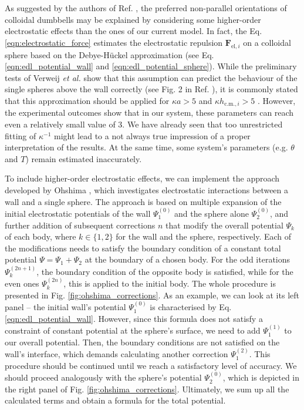 \documentclass{master_thesis}
\begin{document}
As suggested by the authors of Ref. \cite{verweij2021}, the preferred non-parallel orientations of colloidal dumbbells may be explained by considering some higher-order electrostatic effects than the ones of our current model. In fact, the Eq. \eqref{eqn:electrostatic_force} estimates the electrostatic repulsion $\boldsymbol{F}_{\textrm{el},i}$ on a colloidal sphere based on the Debye-Hückel approximation (see Eq. \eqref{eqn:edl_potential_wall} and \eqref{eqn:edl_potential_sphere}). While the preliminary tests of Verweij \textit{et al.} \cite{verweij2021} show that this assumption can predict the behaviour of the single spheres above the wall correctly (see Fig. 2 in Ref. \cite{verweij2021}), it is commonly stated that this approximation should be applied for $\kappa a>5$ and $\kappa h_{\textrm{c.m.},i}>5$ \cite{verwey_overbeek_1948,kim_karilla,andelman_2006}. However, the experimental outcomes show that in our system, these parameters can reach even a relatively small value of 3. We have already seen that too unrestricted fitting of $\kappa^{-1}$ might lead to a not always true impression of a proper interpretation of the results. At the same time, some system's parameters (e.g. $\theta$ and $T$) remain estimated inaccurately.

To include higher-order electrostatic effects, we can implement the approach developed by Ohshima \cite{ohshima1998}, which investigates electrostatic interactions between a wall and a single sphere. The approach is based on multiple expansion of the initial electrostatic potentials of the wall $\Psi_1^{(0)}$ and the sphere alone $\Psi_2^{(0)}$, and further addition of subsequent corrections $n$ that modify the overall potential $\Psi_k$ of each body, where $k\in \{1,2\}$ for the wall and the sphere, respectively. Each of the modifications needs to satisfy the boundary condition of a constant total potential $\Psi=\Psi_1 + \Psi_2$ at the boundary of a chosen body. For the odd iterations $\Psi^{(2n + 1)}_k$, the boundary condition of the opposite body is satisfied, while for the even ones $\Psi^{(2n)}_k$, this is applied to the initial body. The whole procedure is presented in Fig. \ref{fig:ohshima_corrections}. As an example, we can look at its left panel -- the initial wall's potential $\Psi_1^{(0)}$ is characterised by Eq. \eqref{eqn:edl_potential_wall}. However, since this formula does not satisfy a constraint of constant potential at the sphere's surface, we need to add $\Psi_1^{(1)}$ to our overall potential. Then, the boundary conditions are not satisfied on the wall's interface, which demands calculating another correction $\Psi_1^{(2)}$. This procedure should be continued until we reach a satisfactory level of accuracy. We should proceed analogously with the sphere's potential $\Psi_2^{(0)}$, which is depicted in the right panel of Fig. \ref{fig:ohshima_corrections}. Ultimately, we sum up all the calculated terms and obtain a formula for the total potential.
\end{document}
